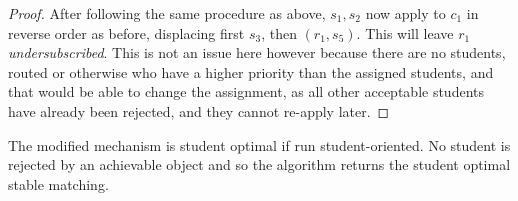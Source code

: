 \documentclass[runningheads]{llncs}
\begin{document}
\begin{proof}
    After following the same procedure as above, $s_1,s_2$ now apply to $c_1$ in reverse order as before, displacing first $s_3$, then $(r_1,s_5)$. This will leave $r_1$ \textit{undersubscribed}. This is not an issue here however because there are no students, routed or otherwise who have a higher priority than the assigned students, and that would be able to change the assignment, as all other acceptable students have already been rejected, and they cannot re-apply later.
\end{proof}

\begin{theorem}
    The modified mechanism is student optimal if run student-oriented. No student is rejected by an achievable object and so the algorithm returns the student optimal stable matching.
\end{theorem}
\end{document}
